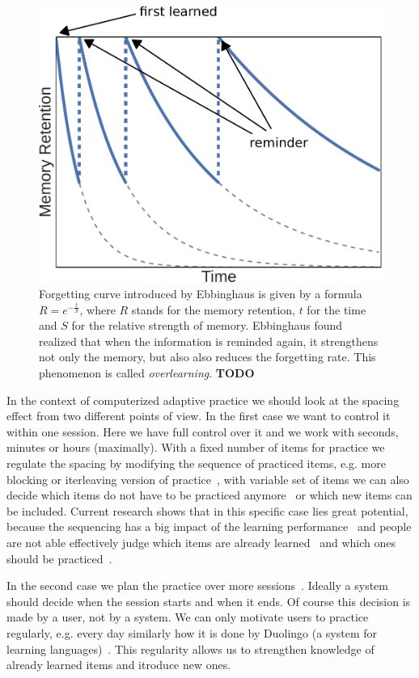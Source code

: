 \documentclass[table,color]{fithesis3/fithesis3}
\begin{document}
\begin{figure}
	\begin{center}
		\includegraphics[width=.6\textwidth]{figure/forgetting_curves}
		\caption{Forgetting curve introduced by Ebbinghaus is given by a
			formula $R = e^{-\frac{t}{S}}$, where $R$ stands for the memory retention, $t$
			for the time and $S$ for the relative strength of memory. Ebbinghaus
			found realized that when the information is reminded again, it strengthens
			not only the memory, but also also reduces the forgetting rate. This phenomenon
			is called \emph{overlearning}.
			\textbf{TODO}}
	\end{center}
\end{figure}

In the context of computerized adaptive practice we should look at the spacing
effect from two different points of view. In the first case we want to control
it within one session. Here we have full control over it and we work with
seconds, minutes or hours (maximally). With a fixed number of items for
practice we regulate the spacing by modifying the sequence of practiced items,
e.g. more blocking or iterleaving version of
practice~\cite{ostrow2015blocking}, with variable set of items we can also
decide which items do not have to be practiced
anymore~\cite{kornell2008optimising} or which new items can be included.
Current research shows that in this specific case lies great potential, because
the sequencing has a big impact of the learning
performance~\cite{ostrow2015blocking} and people are not able effectively judge
which items are already learned~\cite{kornell2008optimising} and which ones
should be practiced~\cite{kornell2014focusing}.

In the second case we plan the practice over more
sessions~\cite{kang2014retrieval}. Ideally a system should decide when the
session starts and when it ends. Of course this decision is made by a user,
not by a system. We can only motivate users to practice regularly, e.g. every
day similarly how it is done by Duolingo (a system for learning
languages)~\cite{garcia2013learning}. This regularity allows us to strengthen
knowledge of already learned items and itroduce new ones.
\end{document}
